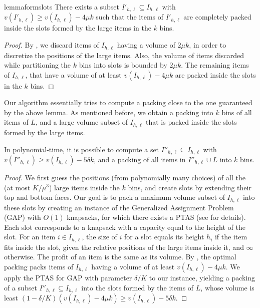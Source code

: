 \documentclass[a4paper,UKenglish,cleveref, autoref, thm-restate]{lipics-v2021}
\begin{document}
\begin{restatable}{lemma}{formslots}
\label{lem:formslots}
    There exists a subset $I'_{h,\ell}\subseteq I_{h,\ell}$ with $v(I'_{h,\ell})\ge v(I_{h,\ell})-4\mu k$ such that the items of $I'_{h,\ell}$ are completely packed inside the slots formed by the large items in the $k$ bins.
\end{restatable}
\begin{proof}
    By , we discard items of $I_{h,\ell}$ having a volume of $2\mu k$, in order to discretize the positions of the large items. Also, the volume of items discarded while partitioning the $k$ bins into slots is bounded by $2\mu k$. The remaining items of $I_{h,\ell}$, that have a volume of at least $v(I_{h,\ell})-4\mu k$ are packed inside the slots in the $k$ bins.
\end{proof}

Our algorithm essentially tries to compute a packing close to the one guaranteed by the above lemma. As mentioned before, we obtain a packing into $k$ bins of all items of $L$, and a large volume subset of $I_{h,\ell}$ that is packed inside the slots formed by the large items. 

\begin{lemma}
\label{lem:GAP}
    In polynomial-time, it is possible to compute a set $I''_{h,\ell} \subseteq I_{h,\ell}$ with $v(I''_{h,\ell})\ge v(I_{h,\ell})-5\delta k$, and a packing of all items in $I''_{h,\ell}\cup L$ into $k$ bins.
\end{lemma}
\begin{proof}
    We first guess the positions (from polynomially many choices) of all the (at most $K/\mu^3$) large items inside the $k$ bins, and create slots by extending their top and bottom faces. Our goal is to pack a maximum volume subset of $I_{h,\ell}$ into these slots by creating an instance of the Generalized Assignment Problem (GAP) with $O(1)$ knapsacks, for which there exists a PTAS \cite{2dknapsack-lpacking} (see  for details). Each slot corresponds to a knapsack with a capacity equal to the height of the slot. For an item $i\in I_{h,\ell}$, the size of $i$ for a slot equals its height $h_i$ if the item fits inside the slot, given the relative positions of the large items inside it, and $\infty$ otherwise. The profit of an item is the same as its volume. 
    By , the optimal packing packs items of $I_{h,\ell}$ having a volume of at least $v(I_{h,\ell})-4\mu k$. We apply the PTAS for GAP with parameter $\delta/K$ to our instance, yielding a packing of a subset $I''_{h,\ell} \subseteq I_{h,\ell}$ into the slots formed by the items of $L$, whose volume is least $(1-\delta/K)(v(I_{h,\ell})-4\mu k) \ge v(I_{h,\ell})-5\delta k$.
\end{proof}
\end{document}
